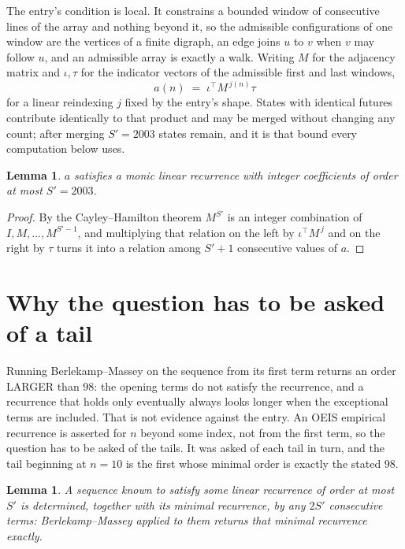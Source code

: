 \documentclass[11pt,a4paper]{article}
\theoremstyle{plain}
\newtheorem{lemma}[theorem]{Lemma}
\theoremstyle{definition}
\begin{document}
The entry's condition is local. It constrains a bounded window of consecutive lines of the
array and nothing beyond it, so the admissible configurations of one window are the vertices of
a finite digraph, an edge joins $u$ to $v$ when $v$ may follow $u$, and an admissible array is
exactly a walk. Writing $M$ for the adjacency matrix and $\iota,\tau$ for the indicator vectors
of the admissible first and last windows,
\[
a(n)\;=\;\iota^{\!\top}M^{\,j(n)}\tau
\]
for a linear reindexing $j$ fixed by the entry's shape. States with identical futures
contribute identically to that product and may be merged without changing any count; after
merging $S'=2003$ states remain, and it is that bound every computation below uses.

\begin{lemma}\label{lem:cf}
$a$ satisfies a monic linear recurrence with integer coefficients of order at most $S'=2003$.
\end{lemma}

\begin{proof}
By the Cayley--Hamilton theorem $M^{S'}$ is an integer combination of $I,M,\dots,M^{S'-1}$,
and multiplying that relation on the left by $\iota^{\!\top}M^{\,j}$ and on the right by
$\tau$ turns it into a relation among $S'+1$ consecutive values of $a$.
\end{proof}

\section{Why the question has to be asked of a tail}

Running Berlekamp--Massey on the sequence from its first term returns an order LARGER than $98$: the opening terms do not satisfy the recurrence, and a recurrence that holds only eventually always looks longer when the exceptional terms are included. That is not evidence against the entry. An OEIS empirical recurrence is asserted for $n$ beyond some index, not from the first term, so the question has to be asked of the tails. It was asked of each tail in turn, and the tail beginning at $n=10$ is the first whose minimal order is exactly the stated $98$.

\begin{lemma}\label{lem:bm}
A sequence known to satisfy some linear recurrence of order at most $S'$ is determined,
together with its minimal recurrence, by any $2S'$ consecutive terms: Berlekamp--Massey applied
to them returns that minimal recurrence exactly.
\end{lemma}
\end{document}
